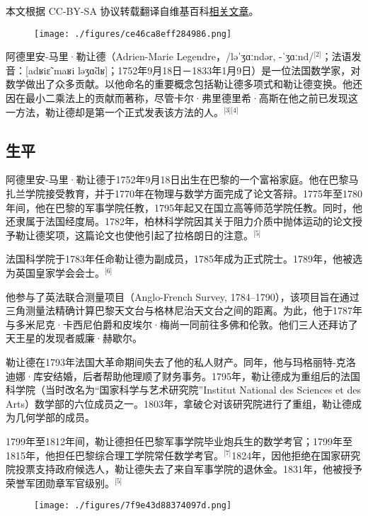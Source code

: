 
本文根据 CC-BY-SA 协议转载翻译自维基百科\href{https://en.wikipedia.org/wiki/Adrien-Marie_Legendre}{相关文章}。

\begin{figure}[ht]
\centering
\texttt{[image: ./figures/ce46ca8eff284986.png]}
\caption{} \label{fig_adla_1}
\end{figure}
阿德里安-马里·勒让德（Adrien-Marie Legendre，/ləˈʒɑːndər, -ˈʒɑːnd/\(^\text{[2]}\)；法语发音：[adʁiɛ̃ maʁi ləʒɑ̃dʁ]；1752年9月18日－1833年1月9日）是一位法国数学家，对数学做出了众多贡献。以他命名的重要概念包括勒让德多项式和勒让德变换。他还因在最小二乘法上的贡献而著称，尽管卡尔·弗里德里希·高斯在他之前已发现这一方法，勒让德却是第一个正式发表该方法的人。\(^\text{[3][4]}\)
\subsection{生平}
阿德里安-马里·勒让德于1752年9月18日出生在巴黎的一个富裕家庭。他在巴黎马扎兰学院接受教育，并于1770年在物理与数学方面完成了论文答辩。1775年至1780年间，他在巴黎的军事学院任教，1795年起又在国立高等师范学院任教。同时，他还隶属于法国经度局。1782年，柏林科学院因其关于阻力介质中抛体运动的论文授予勒让德奖项，这篇论文也使他引起了拉格朗日的注意。\(^\text{[5]}\)

法国科学院于1783年任命勒让德为副成员，1785年成为正式院士。1789年，他被选为英国皇家学会会士。\(^\text{[6]}\)

他参与了英法联合测量项目（Anglo-French Survey, 1784–1790），该项目旨在通过三角测量法精确计算巴黎天文台与格林尼治天文台之间的距离。为此，他于1787年与多米尼克·卡西尼伯爵和皮埃尔·梅尚一同前往多佛和伦敦。他们三人还拜访了天王星的发现者威廉·赫歇尔。

勒让德在1793年法国大革命期间失去了他的私人财产。同年，他与玛格丽特-克洛迪娜·库安结婚，后者帮助他理顺了财务事务。1795年，勒让德成为重组后的法国科学院（当时改名为“国家科学与艺术研究院”Institut National des Sciences et des Arts）数学部的六位成员之一。1803年，拿破仑对该研究院进行了重组，勒让德成为几何学部的成员。

1799年至1812年间，勒让德担任巴黎军事学院毕业炮兵生的数学考官；1799年至1815年，他担任巴黎综合理工学院常任数学考官。\(^\text{[7]}\)1824年，因他拒绝在国家研究院投票支持政府候选人，勒让德失去了来自军事学院的退休金。1831年，他被授予荣誉军团勋章军官级别。\(^\text{[5]}\)
\begin{figure}[ht]
\centering
\texttt{[image: ./figures/7f9e43d88374097d.png]}
\caption{} \label{fig_adla_2}
\end{figure}